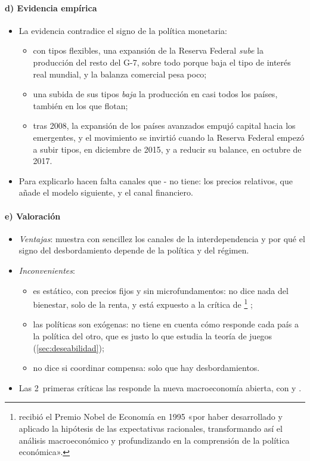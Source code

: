 \documentclass[11pt]{article}
\begin{document}
\paragraph{d) Evidencia empírica}
\begin{itemize}
\item La evidencia contradice el signo de la política monetaria:
  \begin{itemize}
  \item con tipos flexibles, una expansión de la Reserva Federal \emph{sube} la producción del resto del G-7, sobre todo porque baja el tipo de interés real mundial, y la balanza comercial pesa poco\nocite{Kim2001International};
  \item una subida de sus tipos \emph{baja} la producción en casi todos los países, también en los que flotan\nocite{DedolaRivoltaStracca2017};
  \item tras 2008, la expansión de los países avanzados empujó capital hacia los emergentes, y el movimiento se invirtió cuando la Reserva Federal empezó a subir tipos, en diciembre de 2015\nocite{Fed2015FOMCdic}, y a reducir su balance, en octubre de 2017\nocite{Fed2017Balance}.
  \end{itemize}
\item Para explicarlo hacen falta canales que - no tiene: los precios relativos, que añade el modelo siguiente, y el canal financiero.
\end{itemize}

\paragraph{e) Valoración}
\begin{itemize}
\item \emph{Ventajas}: muestra con sencillez los canales de la interdependencia y por qué el signo del desbordamiento depende de la política y del régimen.
\item \emph{Inconvenientes}:
  \begin{itemize}
  \item es estático, con precios fijos y sin microfundamentos: no dice nada del bienestar, solo de la renta, y está expuesto a la crítica de \textcite{Lucas1976Econometric}\footnote{ recibió el Premio Nobel de Economía en 1995 «por haber desarrollado y aplicado la hipótesis de las expectativas racionales, transformando así el análisis macroeconómico y profundizando en la comprensión de la política económica»\nocite{NobelPrize1995Lucas}.} ;
  \item las políticas son exógenas: no tiene en cuenta cómo responde cada país a la política del otro, que es justo lo que estudia la teoría de juegos (\ref{sec:deseabilidad});
  \item no dice si coordinar compensa: solo que hay desbordamientos.
  \end{itemize}
\item Las 2~primeras críticas las responde la nueva macroeconomía abierta, con  y .
\end{itemize}
\end{document}
